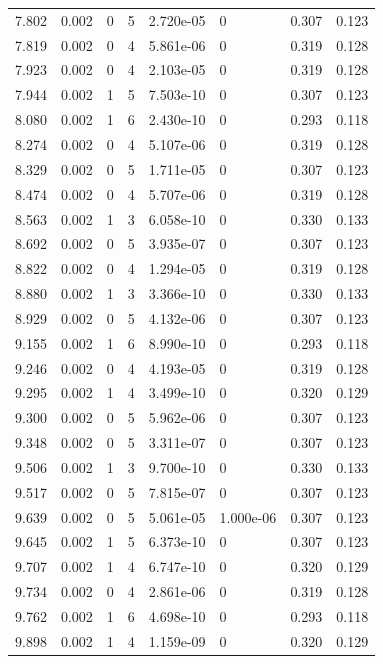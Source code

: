 \documentclass[preview]{standalone}
\begin{document}
{{{\begin{tabular}{L{1.2cm}C{1.2cm} C{0.3cm}C{0.5cm} C{1.4cm}C{1.4cm} C{1.4cm}C{1.4cm}}
  7.802  &  0.002  & 0     &  5 &  2.720e-05  & 0  & 0.307 &  0.123   \\ 
  7.819  &  0.002  & 0     &  4 &  5.861e-06  & 0  & 0.319 &  0.128   \\ 
  7.923  &  0.002  & 0     &  4 &  2.103e-05  & 0  & 0.319 &  0.128   \\ 
  7.944  &  0.002  & 1     &  5 &  7.503e-10  & 0  & 0.307 &  0.123   \\ 
  8.080  &  0.002  & 1     &  6 &  2.430e-10  & 0  & 0.293 &  0.118   \\ 
  8.274  &  0.002  & 0     &  4 &  5.107e-06  & 0  & 0.319 &  0.128   \\ 
  8.329  &  0.002  & 0     &  5 &  1.711e-05  & 0  & 0.307 &  0.123   \\ 
  8.474  &  0.002  & 0     &  4 &  5.707e-06  & 0  & 0.319 &  0.128   \\ 
  8.563  &  0.002  & 1     &  3 &  6.058e-10  & 0  & 0.330 &  0.133   \\ 
  8.692  &  0.002  & 0     &  5 &  3.935e-07  & 0  & 0.307 &  0.123   \\ 
  8.822  &  0.002  & 0     &  4 &  1.294e-05  & 0  & 0.319 &  0.128   \\ 
  8.880  &  0.002  & 1     &  3 &  3.366e-10  & 0  & 0.330 &  0.133   \\ 
  8.929  &  0.002  & 0     &  5 &  4.132e-06  & 0  & 0.307 &  0.123   \\ 
  9.155  &  0.002  & 1     &  6 &  8.990e-10  & 0  & 0.293 &  0.118   \\ 
  9.246  &  0.002  & 0     &  4 &  4.193e-05  & 0  & 0.319 &  0.128   \\ 
  9.295  &  0.002  & 1     &  4 &  3.499e-10  & 0  & 0.320 &  0.129   \\ 
  9.300  &  0.002  & 0     &  5 &  5.962e-06  & 0  & 0.307 &  0.123   \\ 
  9.348  &  0.002  & 0     &  5 &  3.311e-07  & 0  & 0.307 &  0.123   \\ 
  9.506  &  0.002  & 1     &  3 &  9.700e-10  & 0  & 0.330 &  0.133   \\ 
  9.517  &  0.002  & 0     &  5 &  7.815e-07  & 0  & 0.307 &  0.123   \\ 
  9.639  &  0.002  & 0     &  5 &  5.061e-05  & 1.000e-06  & 0.307 &  0.123   \\ 
  9.645  &  0.002  & 1     &  5 &  6.373e-10  & 0  & 0.307 &  0.123   \\ 
  9.707  &  0.002  & 1     &  4 &  6.747e-10  & 0  & 0.320 &  0.129   \\ 
  9.734  &  0.002  & 0     &  4 &  2.861e-06  & 0  & 0.319 &  0.128   \\ 
  9.762  &  0.002  & 1     &  6 &  4.698e-10  & 0  & 0.293 &  0.118   \\ 
  9.898  &  0.002  & 1     &  4 &  1.159e-09  & 0  & 0.320 &  0.129   \\ 
\hline 
\end{tabular} 

}}}
\end{document}
